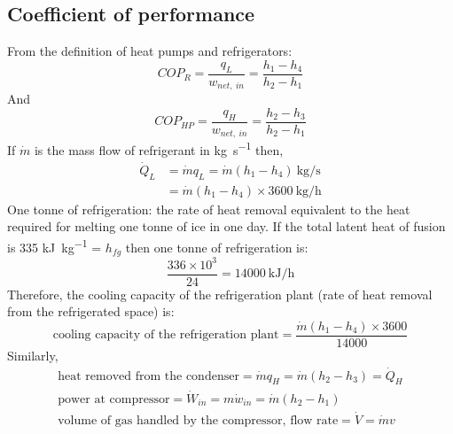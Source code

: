 \documentclass[class=report, crop=false, 12pt,a4paper]{standalone}
\begin{document}
\subsection{Coefficient of performance}
From the definition of heat pumps and refrigerators:
\begin{equation}
  COP_R = \frac{q_L}{w_{net, \ in}} = \frac{h_1 - h_4}{h_2 - h_1}
\end{equation}
And
\begin{equation}
  COP_{HP} = \frac{q_H}{w_{net, \ in}} = \frac{h_2 - h_3}{h_2 - h_1}
\end{equation}
If $\dot{m}$ is the mass flow of refrigerant in \si{\kg\per\second} then,
\begin{align}
  \dot{Q}_L &= \dot{m}q_L = \dot{m} (h_1 - h_4) \ \si{\kg\per\second}\\
  &= \dot{m} (h_1 - h_4) \times 3600 \ \si{\kg\per\hour}
\end{align}
One tonne of refrigeration: the rate of heat removal equivalent to the heat required for melting one tonne of ice in one day. If the total latent heat of fusion is 335 \si{\kilo\joule\per\kg} = $h_{fg}$ then one tonne of refrigeration is:
\begin{equation}
  \frac{336 \times 10^{3}}{24} = 14000 \ \si{\kilo\joule\per\hour}
\end{equation}
Therefore, the cooling capacity of the refrigeration plant (rate of heat removal from the refrigerated space) is:
\begin{equation}
  \textrm{cooling capacity of the refrigeration plant} = \frac{\dot{m}(h_1 - h_4) \times 3600}{14000}
\end{equation}
Similarly,
\begin{gather}
  \textrm{heat removed from the condenser} = \dot{m} q_H = \dot{m} (h_2 - h_3) = \dot{Q}_H\\
  \textrm{power at compressor} = \dot{W}_{in} = m\dot{w}_{in} = \dot{m} (h_2 - h_1)\\
  \textrm{volume of gas handled by the compressor, flow rate} = \dot{V} = \dot{m}v
\end{gather}
\end{document}
